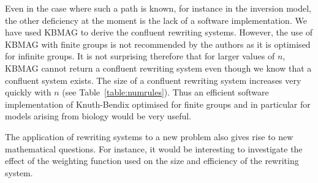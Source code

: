 \documentclass[utf8]{Frontiers_LaTex_Templates/frontiersFPHY} %
\numberwithin{equation}{section}
\begin{document}
Even in the case where such a path is known, for instance in the inversion model, the other deficiency at the moment is the lack of a software implementation. We have used KBMAG to derive the confluent rewriting systems. However, the use of KBMAG with finite groups is not recommended by the authors as it is optimised for infinite groups. It is not surprising therefore that for larger values of $n$, KBMAG cannot return a confluent rewriting system even though we know that a confluent system exists. The size of a confluent rewriting system increases very quickly with $n$ (see Table~\ref{table:numrules}). Thus an efficient software implementation of Knuth-Bendix optimised for finite groups and in particular for models arising from biology would be very useful.


The application of rewriting systems to a new problem also gives rise to new mathematical questions. For instance, it would be interesting to investigate the effect of the weighting function used on the size and efficiency of the rewriting system.



\end{document}
